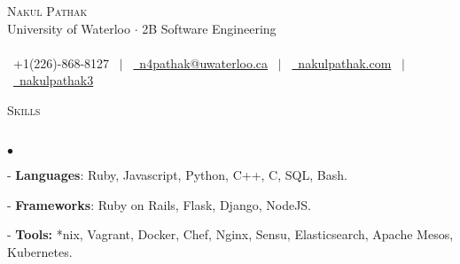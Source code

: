 \documentclass[11pt]{article}
\newcommand{\lineunder}{\vspace*{-8pt} \\ \hspace*{-18pt} \hrulefill \\}
\newcommand{\header}[1]{{\hspace*{-15pt}\vspace*{6pt} \textsc{#1}} \vspace*{-6pt} \lineunder }
\newenvironment{achievements}{\begin{list}{$\bullet$}{\topsep 0pt \itemsep -1.5pt \leftmargin 5pt}}{\vspace*{4pt}\end{list}}
\begin{document}
\small
\smallskip
\vspace*{-45pt}

\begin{center}
	{\Huge \scshape {Nakul Pathak}} \\
	\vspace*{6pt} 
{\fontsize{10}{1}\selectfont University of Waterloo $\cdot$ 2B Software Engineering} \\
\vspace{-4pt}
\hspace*{-18pt} \hrulefill \\
\vspace{2pt}
\hspace*{-13pt} \faPhone \  +1(226)-868-8127 \ $|$ \  \href{mailto:n4pathak@uwaterloo.ca}{\faEnvelope \ n4pathak@uwaterloo.ca} \  $|$ \  \href{http://nakulpathak.com}{\faGlobe \ nakulpathak.com}  \ $|$ \   \href{https://github.com/nakulpathak3}{\faGithub \ nakulpathak3}
\vspace{-5pt}
\end{center}

\vspace{2pt}

\header{\fontsize{11.1}{10}\selectfont Skills}
\begin{achievements}
\item[-] \textbf{Languages}: Ruby, Javascript, Python, C++, C, SQL, Bash.
\vspace{1pt}
\item[-] \textbf{Frameworks}: Ruby on Rails, Flask, Django, NodeJS.
\vspace{1pt}
\item[-] \textbf{Tools:} *nix, Vagrant, Docker, Chef, Nginx, Sensu, Elasticsearch, Apache Mesos, Kubernetes.
\end{achievements}

\vspace{4pt}
\end{document}
